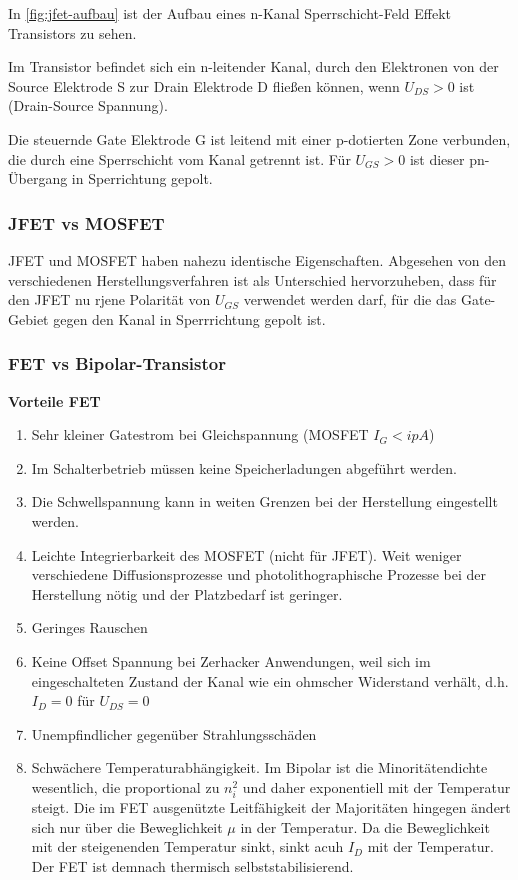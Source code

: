 In \autoref{fig:jfet-aufbau} ist der Aufbau eines n-Kanal Sperrschicht-Feld Effekt Transistors zu sehen. 

Im Transistor befindet sich ein n-leitender Kanal, durch den Elektronen von der Source Elektrode S zur Drain Elektrode D fließen können, wenn $U_{DS} > 0$ ist (Drain-Source Spannung).

Die steuernde Gate Elektrode G ist leitend mit einer p-dotierten Zone verbunden, die durch eine Sperrschicht vom Kanal getrennt ist. 
Für $U_{GS} > 0$ ist dieser pn-Übergang in Sperrichtung gepolt.

\subsubsection{JFET vs MOSFET}
JFET und MOSFET haben nahezu identische Eigenschaften. Abgesehen von den verschiedenen Herstellungsverfahren ist als Unterschied hervorzuheben, dass für den JFET nu rjene Polarität von $U_{GS} $ verwendet werden darf, für die das Gate-Gebiet gegen den Kanal in Sperrrichtung gepolt ist. 

\subsubsection{FET vs Bipolar-Transistor}

\textbf{Vorteile FET}
\begin{enumerate}
    \item Sehr kleiner Gatestrom bei Gleichspannung (MOSFET $I_G < ipA$)
    \item Im Schalterbetrieb müssen keine Speicherladungen abgeführt werden. 
    \item Die Schwellspannung kann in weiten Grenzen bei der Herstellung eingestellt werden.
    \item Leichte Integrierbarkeit des MOSFET (nicht für JFET). Weit weniger verschiedene Diffusionsprozesse und photolithographische Prozesse bei der Herstellung nötig und der Platzbedarf ist geringer.
    \item Geringes Rauschen
    \item Keine Offset Spannung bei Zerhacker Anwendungen, weil sich im eingeschalteten Zustand der Kanal wie ein ohmscher Widerstand verhält, d.h. $I_D=0$ für $U_{DS} = 0$
    \item Unempfindlicher gegenüber Strahlungsschäden
    \item Schwächere Temperaturabhängigkeit. Im Bipolar ist die Minoritätendichte wesentlich, die proportional zu $n_i^2$ und daher exponentiell mit der Temperatur steigt. Die im FET ausgenützte Leitfähigkeit der Majoritäten hingegen ändert sich nur über die Beweglichkeit $\mu$ in der Temperatur. Da die Beweglichkeit mit der steigenenden Temperatur sinkt, sinkt acuh $I_D$ mit der Temperatur. Der FET ist demnach thermisch selbststabilisierend.
\end{enumerate}

